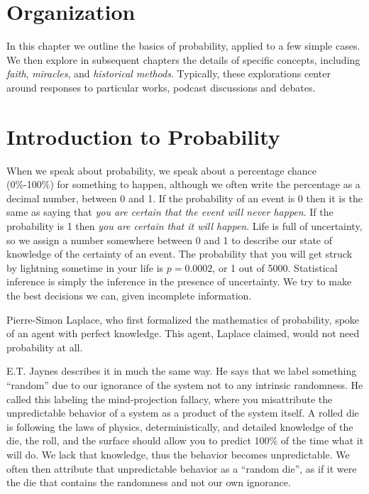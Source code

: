 \section{Organization}

In this chapter we outline the basics of probability, applied to a few simple cases.  We then explore in subsequent chapters the details of specific concepts, including {\em faith}, {\em miracles}, and {\em historical methods}.  Typically, these explorations center around responses to particular works, podcast discussions and debates.  


\section{Introduction to Probability}

When we speak about probability, we speak about a percentage chance (0\%-100\%) for something to happen, although we often write the percentage as a decimal number, between 0 and 1.  If the  probability of an event is 0 then it is the same as saying that {\em you are certain that the event will never happen}.  If the probability is 1 then {\em you are certain that it {\em will} happen}.  Life is full of uncertainty, so we assign a number somewhere between 0 and 1 to describe our state of knowledge of the certainty of an event. The probability that you will get struck by lightning sometime in your life is $p=0.0002$, or 1 out of 5000. Statistical inference is simply the inference in the presence of uncertainty.  We try to make the best decisions we can, given incomplete information.  

Pierre-Simon Laplace, who first formalized the mathematics of probability, spoke of an agent with perfect knowledge.  This agent, Laplace claimed, would not need probability at all.

E.T. Jaynes describes it in much the same way.  He says that we label something ``random'' due to our ignorance of the system not to any intrinsic randomness.  He called this labeling the mind-projection fallacy\cite{Jaynes2003}, where you misattribute the unpredictable behavior of a system as a product of the system itself. A rolled die is following the laws of physics, deterministically, and detailed knowledge of the die, the roll, and the surface should allow you to predict 100\% of the time what it will do.  We lack that knowledge, thus the behavior becomes unpredictable. We often then attribute that unpredictable behavior as a ``random die'', as if it were the die that contains the randomness and not our own ignorance.


